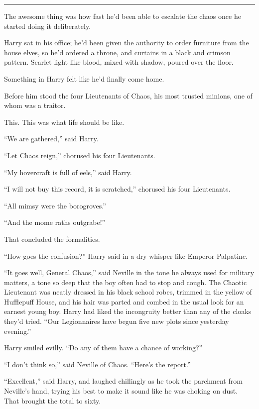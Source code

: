 \begin{center}\rule{3in}{0.4pt}\end{center}

The awesome thing was how fast he'd been able to escalate the chaos once
he started doing it deliberately.

Harry sat in his office; he'd been given the authority to order
furniture from the house elves, so he'd ordered a throne, and curtains
in a black and crimson pattern. Scarlet light like blood, mixed with
shadow, poured over the floor.

Something in Harry felt like he'd finally come home.

Before him stood the four Lieutenants of Chaos, his most trusted
minions, one of whom was a traitor.

This. This was what life should be like.

``We are gathered,'' said Harry.

``Let Chaos reign,'' chorused his four Lieutenants.

``My hovercraft is full of eels,'' said Harry.

``I will not buy this record, it is scratched,'' chorused his four
Lieutenants.

``All mimsy were the borogroves.''

``And the mome raths outgrabe!''

That concluded the formalities.

``How goes the confusion?'' Harry said in a dry whisper like Emperor
Palpatine.

``It goes well, General Chaos,'' said Neville in the tone he always used
for military matters, a tone so deep that the boy often had to stop and
cough. The Chaotic Lieutenant was neatly dressed in his black school
robes, trimmed in the yellow of Hufflepuff House, and his hair was
parted and combed in the usual look for an earnest young boy. Harry had
liked the incongruity better than any of the cloaks they'd tried. ``Our
Legionnaires have begun five new plots since yesterday evening.''

Harry smiled evilly. ``Do any of them have a chance of working?''

``I don't think so,'' said Neville of Chaos. ``Here's the report.''

``Excellent,'' said Harry, and laughed chillingly as he took the
parchment from Neville's hand, trying his best to make it sound like he
was choking on dust. That brought the total to sixty.


